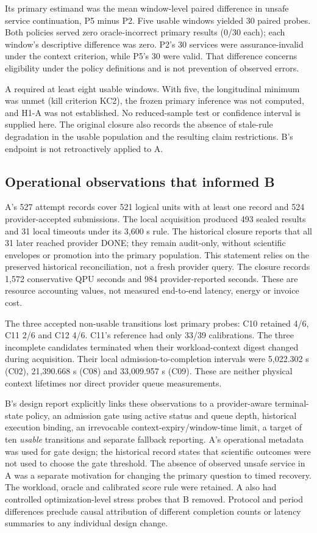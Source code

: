 \documentclass[11pt,a4paper]{article}
\begin{document}
Its primary estimand was the mean window-level paired difference in unsafe service continuation, P5 minus P2. Five usable windows yielded 30 paired probes. Both policies served zero oracle-incorrect primary results (0/30 each); each window's descriptive difference was zero. P2's 30 services were assurance-invalid under the context criterion, while P5's 30 were valid. That difference concerns eligibility under the policy definitions and is not prevention of observed errors.

A required at least eight usable windows. With five, the longitudinal minimum was unmet (kill criterion KC2), the frozen primary inference was not computed, and H1-A was not established. No reduced-sample test or confidence interval is supplied here. The original closure also records the absence of stale-rule degradation in the usable population and the resulting claim restrictions. B's endpoint is not retroactively applied to A.

\subsection{Operational observations that informed B}
A's 527 attempt records cover 521 logical units with at least one record and 524 provider-accepted submissions. The local acquisition produced 493 sealed results and 31 local timeouts under its 3,600 s rule. The historical closure reports that all 31 later reached provider DONE; they remain audit-only, without scientific envelopes or promotion into the primary population. This statement relies on the preserved historical reconciliation, not a fresh provider query. The closure records 1,572 conservative QPU seconds and 984 provider-reported seconds. These are resource accounting values, not measured end-to-end latency, energy or invoice cost.

The three accepted non-usable transitions lost primary probes: C10 retained 4/6, C11 2/6 and C12 4/6. C11's reference had only 33/39 calibrations. The three incomplete candidates terminated when their workload-context digest changed during acquisition. Their local admission-to-completion intervals were 5,022.302 s (C02), 21,390.668 s (C08) and 33,009.957 s (C09). These are neither physical context lifetimes nor direct provider queue measurements.

B's design report explicitly links these observations to a provider-aware terminal-state policy, an admission gate using active status and queue depth, historical execution binding, an irrevocable context-expiry/window-time limit, a target of ten \emph{usable} transitions and separate fallback reporting. A's operational metadata was used for gate design; the historical record states that scientific outcomes were not used to choose the gate threshold. The absence of observed unsafe service in A was a separate motivation for changing the primary question to timed recovery. The workload, oracle and calibrated score rule were retained. A also had controlled optimization-level stress probes that B removed. Protocol and period differences preclude causal attribution of different completion counts or latency summaries to any individual design change.
\end{document}
